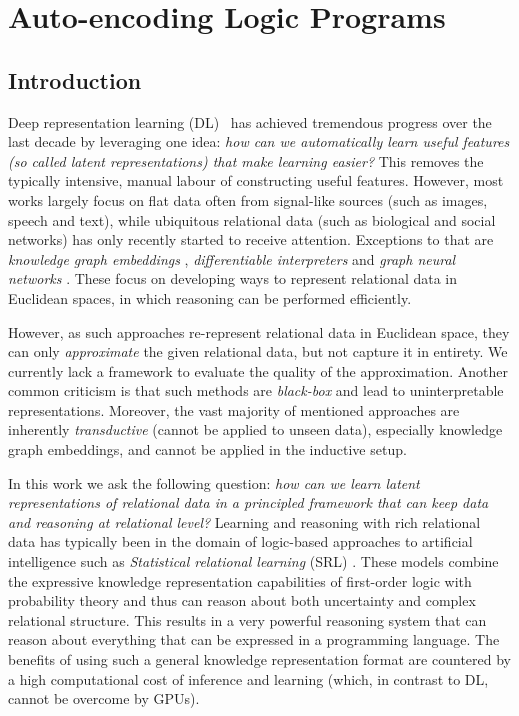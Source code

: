 \chapter{Auto-encoding Logic Programs}\label{ch:alps}



\section{Introduction}


Deep representation learning (DL)~\cite{Goodfellow2016} has achieved tremendous progress over the last decade by leveraging one idea: \textit{how can we automatically learn useful features (so called latent representations) that make learning easier?}
This removes the typically intensive, manual labour of constructing useful features.
However, most works largely focus on flat data often from signal-like sources (such as images, speech and text), while ubiquitous relational data (such as biological and social networks) has only recently started to receive attention.
Exceptions to that are \textit{knowledge graph embeddings} \cite{Nickel0TG16}, \textit{differentiable interpreters} \cite{DTP2017,bosnjak17,Reed:2016} and \textit{graph neural networks} \cite{Scarselli:2009:GNN:1657477.1657482,DBLP:conf/icml/NiepertAK1,ae482107de73461787258f805cf8f4ed}.
These focus on developing ways to represent relational data in Euclidean spaces, in which reasoning can be performed efficiently.




However, as such approaches re-represent relational data in Euclidean space, they can only \textit{approximate} the given relational data, but not capture it in entirety.
We currently lack a framework to evaluate the quality of the approximation.
Another common criticism is that such methods are \textit{black-box} and lead to uninterpretable representations.
Moreover, the vast majority of mentioned approaches are inherently \textit{transductive} (cannot be applied to unseen data), especially knowledge graph embeddings, and cannot be applied in the inductive setup.


In this work we ask the following question: \textit{how can we learn latent representations of relational data in a principled framework that can keep data and reasoning at relational level?}
Learning and reasoning with rich relational data has typically been in the domain of logic-based approaches to artificial intelligence such as \textit{Statistical relational learning} (SRL) \cite{GetoorSRL,Raedt:2016:SRA:3027718}.
These models combine the expressive knowledge representation capabilities of first-order logic with probability theory and thus can reason about both uncertainty and complex relational structure.
This results in a very powerful reasoning system that can reason about everything that can be expressed in a programming language.
The benefits of using such a general knowledge representation format are countered by a high computational cost of inference and learning (which, in contrast to DL, cannot be overcome by GPUs).



